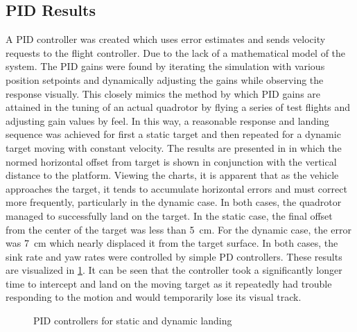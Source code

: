 \subsection{PID Results}
A PID controller was created which uses error estimates and sends velocity requests to the flight controller.
Due to the lack of a mathematical model of the system. The PID gains were found by iterating the simulation
with various position setpoints and dynamically adjusting the gains while observing the response visually.
This closely mimics the method by which PID gains are attained in the tuning of an actual quadrotor by flying
a series of test flights and adjusting gain values by feel. In this way, a reasonable response and landing
sequence was achieved for first a static target and then repeated for a dynamic target moving with constant
velocity. The results are presented in  in which the normed horizontal offset
from target is shown in conjunction with the vertical distance to the platform. Viewing the charts, it is
apparent that as the vehicle approaches the target, it tends to accumulate horizontal errors and must correct
more frequently, particularly in the dynamic case. In both cases, the quadrotor managed to successfully land
on the target. In the static case, the final offset from the center of the target was less than \SI{5}{\cm}.
For the dynamic case, the error was \SI{7}{\cm} which nearly displaced it from the target surface. In both
cases, the sink rate and yaw rates were controlled by simple PD controllers. These results are visualized in
\cref{f:pid_lands}. It can be seen that the controller took a significantly longer time to intercept and land
on the moving target as it repeatedly had trouble responding to the motion and would temporarily lose its
visual track.
\begin{figure}[ht]
    \begin{subfigmatrix}{2}
    \end{subfigmatrix}
    \caption{PID controllers for static and dynamic landing}\label{f:pid_lands}
\end{figure}

